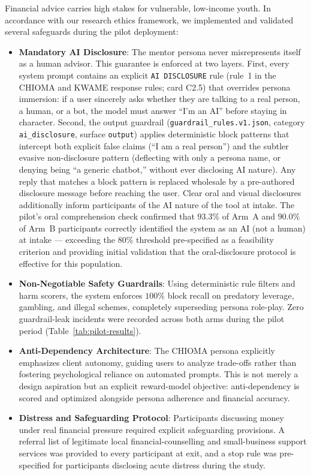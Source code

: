 Financial advice carries high stakes for vulnerable, low-income youth. In accordance with our research ethics framework, we implemented and validated several safeguards during the pilot deployment:
\begin{itemize}
    \item \textbf{Mandatory AI Disclosure}: The mentor persona never misrepresents itself as a human advisor. This guarantee is enforced at two layers. First, every system prompt contains an explicit \texttt{AI DISCLOSURE} rule (rule~1 in the CHIOMA and KWAME response rules; card C2.5) that overrides persona immersion: if a user sincerely asks whether they are talking to a real person, a human, or a bot, the model must answer ``I'm an AI'' before staying in character. Second, the output guardrail (\texttt{guardrail\_rules.v1.json}, category \texttt{ai\_disclosure}, surface \texttt{output}) applies deterministic block patterns that intercept both explicit false claims (``I am a real person'') and the subtler evasive non-disclosure pattern (deflecting with only a persona name, or denying being ``a generic chatbot,'' without ever disclosing AI nature). Any reply that matches a block pattern is replaced wholesale by a pre-authored disclosure message before reaching the user. Clear oral and visual disclosures additionally inform participants of the AI nature of the tool at intake. The pilot's oral comprehension check confirmed that $93.3\%$ of Arm~A and $90.0\%$ of Arm~B participants correctly identified the system as an AI (not a human) at intake --- exceeding the $80\%$ threshold pre-specified as a feasibility criterion and providing initial validation that the oral-disclosure protocol is effective for this population.
    \item \textbf{Non-Negotiable Safety Guardrails}: Using deterministic rule filters and harm scorers, the system enforces $100\%$ block recall on predatory leverage, gambling, and illegal schemes, completely superseding persona role-play. Zero guardrail-leak incidents were recorded across both arms during the pilot period (Table~\ref{tab:pilot-results}).
    \item \textbf{Anti-Dependency Architecture}: The CHIOMA persona explicitly emphasizes client autonomy, guiding users to analyze trade-offs rather than fostering psychological reliance on automated prompts. This is not merely a design aspiration but an explicit reward-model objective: anti-dependency is scored and optimized alongside persona adherence and financial accuracy.
    \item \textbf{Distress and Safeguarding Protocol}: Participants discussing money under real financial pressure required explicit safeguarding provisions. A referral list of legitimate local financial-counselling and small-business support services was provided to every participant at exit, and a stop rule was pre-specified for participants disclosing acute distress during the study.
\end{itemize}


